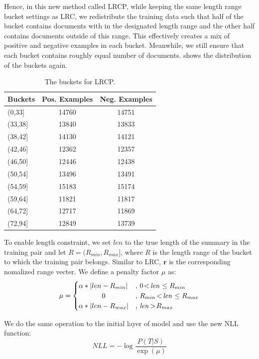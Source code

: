 {Hence, in this new method called LRCP, while keeping the same length
range bucket settings as LRC, we redistribute the training data
such that half of the bucket contains documents with in
the designated length range and the other half contains documents
outside of this range.  This effectively creates a mix of
positive and negative examples in each bucket.
Meanwhile, we still ensure that each bucket contains roughly
equal number of documents. 
shows the distribution of the buckets again.
\begin{table}[t!]
\small
\caption{ The buckets for LRCP. }
\label{tab:datawithpenalty}
\begin{center}
\begin{tabular}{|l|cc|}
\hline \bf Buckets & \bf Pos. Examples & \bf Neg. Examples\\ \hline
(0,33] & 14760 & 14751 \\
(33,38] & 13840 & 13833 \\
(38,42] & 14130 & 14121 \\
(42,46] & 12362 & 12357 \\
(46,50] & 12446 & 12438 \\
(50,54] & 13496 & 13491 \\
(54,59] & 15183 & 15174 \\
(59,64] & 11821 & 11817 \\
(64,72] & 12717 & 11869 \\
(72,94] & 12849 & 13739 \\
\hline
\end{tabular}
\end{center}
\end{table}

To enable length constraint,
we set $len$ to the true length of the summary in the training pair and let
$R = (R_{min}, R_{max}]$, where $R$ is the length range of the bucket to
which the training pair belongs.
Similar to LRC, $\textbf{r}$ is the corresponding nomalized range vecter.
We define a penalty factor $\mu$ as:
\begin{equation}
\mu =
\begin{cases}
\alpha *\left|len-R_{min}\right| & \text{, $0 \!<\!$ \textit{len} $\leq R_{min}$} \\
~~~~~~~~~~0 & \text{, $R_{min} \!<\!$ \textit{len} $ \leq R_{max}$} \\
\alpha *\left|len-R_{max}\right| & \text{, \textit{len} $\!>\! R_{max}$}
\end{cases}
\end{equation}

We do the same operation to the initial layer of model and use the
new NLL function:
\begin{equation}
NLL = -\log \frac{P(T|S)}{\exp(\mu)}
\end{equation}
}%
